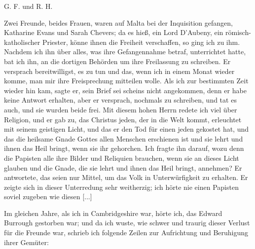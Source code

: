 {  \medskip 

  \begin{flushright}G. F. und R. H.\end{flushright}

}

Zwei Freunde, beides Frauen, waren auf Malta bei der
Inquisition gefangen, Katharine Evans 
und Sarah Chevers; da
es hieß, ein Lord D'Aubeny, 
ein römisch-katholischer Priester,
könne ihnen die Freiheit verschaffen, so ging ich zu ihm. Nachdem 
ich ihn über alles, was ihre Gefangennahme betraf, unterrichtet 
hatte, bat ich ihn, an die dortigen Behörden um ihre
Freilassung zu schreiben. Er versprach bereitwilligst, es zu tun
und das, wenn ich in einem Monat wieder komme, man mir
ihre Freisprechung mitteilen wolle. Als ich zur bestimmten Zeit
wieder hin kam, sagte er, sein Brief sei scheins nicht angekommen,
denn er habe keine Antwort erhalten, aber er versprach, nochmals
zu schreiben, und tat es auch, und sie wurden beide frei.
Mit diesem hohen Herrn redete ich viel über Religion, und
er gab zu, das Christus jeden, der in die Welt kommt, erleuchtet
mit seinem geistigen Licht, und das er den Tod für einen jeden
gekostet hat, und das die heilsame Gnade Gottes allen Menschen
erschienen ist und sie lehrt und ihnen das Heil bringt, wenn sie
ihr gehorchen. Ich fragte ihn darauf, wozu denn die Papisten
alle ihre Bilder und Reliquien brauchen, wenn sie an dieses Licht
glauben und die Gnade, die sie lehrt und ihnen das Heil bringt,
annehmen? Er antwortete, das seien nur Mittel, um das
Volk in Unterwürfigkeit zu erhalten. Er zeigte sich in dieser
Unterredung sehr weitherzig; ich hörte nie einen Papisten soviel
zugeben wie diesen [...]

Im gleichen Jahre, als ich in Cambridgeshire war, hörte ich,
das Edward Burrough gestorben war; und da ich wuste, wie
schwer und traurig dieser Verlust für die Freunde war, schrieb
ich folgende Zeilen zur Aufrichtung und Beruhigung ihrer Gemüter:


